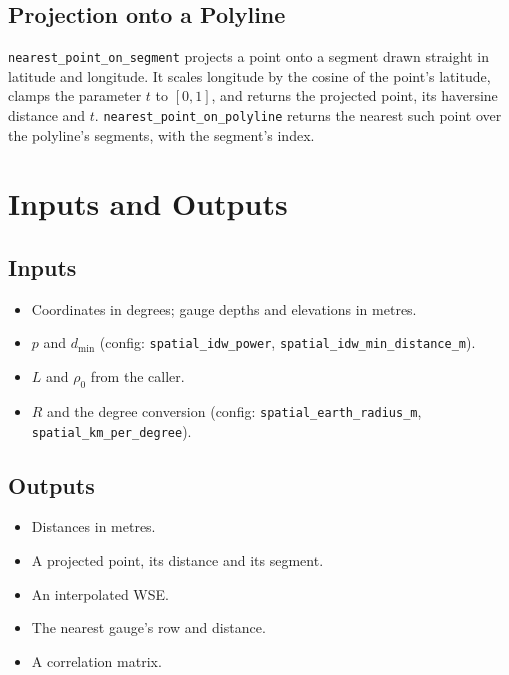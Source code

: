 \documentclass[11pt,a4paper]{article}
\begin{document}
\subsection{Projection onto a Polyline}
\texttt{nearest\_point\_on\_segment} projects a point onto a segment drawn straight in
latitude and longitude. It scales longitude by the cosine of the point's latitude, clamps
the parameter $t$ to $[0,1]$, and returns the projected point, its haversine distance and
$t$. \texttt{nearest\_point\_on\_polyline} returns the nearest such point over the
polyline's segments, with the segment's index.

\section{Inputs and Outputs}

\subsection{Inputs}
\begin{itemize}[nosep]
    \item Coordinates in degrees; gauge depths and elevations in metres.
    \item $p$ and $d_{\min}$ (config: \texttt{spatial\_idw\_power},
          \texttt{spatial\_idw\_min\_distance\_m}).
    \item $L$ and $\rho_0$ from the caller.
    \item $R$ and the degree conversion (config: \texttt{spatial\_earth\_radius\_m},
          \texttt{spatial\_km\_per\_degree}).
\end{itemize}

\subsection{Outputs}
\begin{itemize}[nosep]
    \item Distances in metres.
    \item A projected point, its distance and its segment.
    \item An interpolated WSE.
    \item The nearest gauge's row and distance.
    \item A correlation matrix.
\end{itemize}
\end{document}
